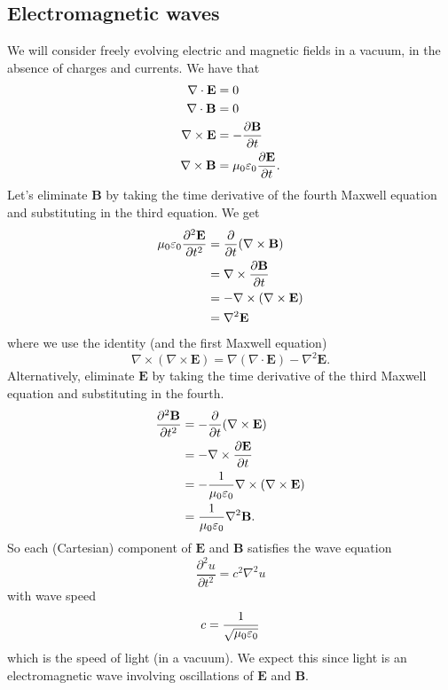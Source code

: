 \documentclass{article}
\begin{document}
\subsection{Electromagnetic waves}
We will consider freely evolving electric and magnetic fields in a vacuum, in the absence of charges and currents. We have that
\begin{align*}
	\nabla\cdot\mathbf E & = 0 \\
	\nabla\cdot\mathbf B & = 0 \\
	\nabla\times\mathbf E &= - \frac{\partial \mathbf B}{\partial t} \\
	\nabla\times\mathbf B &= \mu_0 \varepsilon_0 \frac{\partial \mathbf E}{\partial t}.
\end{align*}
Let's eliminate $ \mathbf B $ by taking the time derivative of the fourth Maxwell equation and substituting in the third equation. We get
\begin{align*}
	\mu_0 \varepsilon_0 \frac{\partial^2 \mathbf E}{\partial t^2} &= \frac\partial{\partial t} (\nabla\times\mathbf B) \\
							      &=\nabla\times\frac{\partial \mathbf B}{\partial t} \\
							      &= - \nabla\times(\nabla\times \mathbf E) \\
							      &= \nabla^2 \mathbf E
\end{align*}
where we use the identity (and the first Maxwell equation)
\[
  \nabla\times(\nabla\times\mathbf E) = \nabla(\nabla\cdot\mathbf E ) - \nabla^2 \mathbf E.
\]
Alternatively, eliminate $ \mathbf E $ by taking the time derivative of the third Maxwell equation and substituting in the fourth.
\begin{align*}
	\frac{\partial^2 \mathbf B}{\partial t^2} &= -\frac\partial{\partial t} (\nabla\times\mathbf E) \\
						  &= -\nabla\times\frac{\partial\mathbf E}{\partial t} \\
						  &= - \frac 1{\mu_0\varepsilon_0}\nabla\times(\nabla\times\mathbf E)\\
						  &=\frac 1{\mu_0\varepsilon_0} \nabla^2 \mathbf B.
\end{align*}
So each (Cartesian) component of $ \mathbf E $ and $ \mathbf B $ satisfies the wave equation
\[
	\frac{\partial^2 u }{\partial t^2} = c^2\nabla^2 u
\]
with wave speed
\[
	c = \frac 1{\sqrt {\mu_0 \varepsilon_0}}
\]
which is the speed of light (in a vacuum). We expect this since light is an electromagnetic wave involving oscillations of $ \mathbf E $ and $ \mathbf B $.\par
\end{document}
